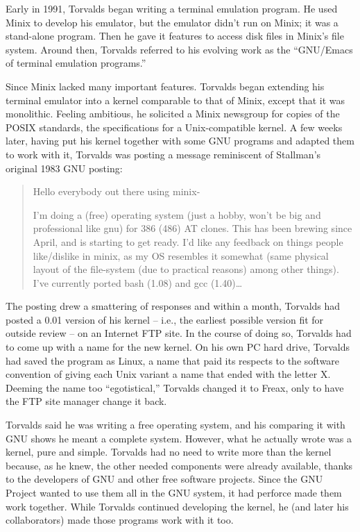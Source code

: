 Early in 1991, Torvalds began writing a terminal emulation program.  He used Minix to develop his emulator, but the emulator didn't run on Minix; it was a stand-alone program.  Then he gave it features to access disk files in Minix's file system.  Around then, Torvalds referred to his evolving work as the ``GNU/Emacs of terminal emulation programs.''

Since Minix lacked many important features. Torvalds began extending his terminal emulator into a kernel comparable to that of Minix, except that it was monolithic.  Feeling ambitious, he solicited a Minix newsgroup for copies of the POSIX standards, the specifications for a Unix-compatible kernel. A few weeks later, having put his kernel together with some GNU programs and adapted them to work with it, Torvalds was posting a message reminiscent of Stallman's original 1983 GNU posting:

\begin{quote}
Hello everybody out there using minix-

I'm doing a (free) operating system (just a hobby, won't be big and professional like gnu) for 386 (486) AT clones. This has been brewing since April, and is starting to get ready. I'd like any feedback on things people like/dislike in minix, as my OS resembles it somewhat (same physical layout of the file-system (due to practical reasons) among other things).  I've currently ported bash (1.08) and gcc (1.40)\ldots{}
\end{quote}

The posting drew a smattering of responses and within a month, Torvalds had posted a 0.01 version of his kernel -- i.e., the earliest possible version fit for outside review -- on an Internet FTP site. In the course of doing so, Torvalds had to come up with a name for the new kernel. On his own PC hard drive, Torvalds had saved the program as Linux, a name that paid its respects to the software convention of giving each Unix variant a name that ended with the letter X. Deeming the name too ``egotistical,'' Torvalds changed it to Freax, only to have the FTP site manager change it back.

Torvalds said he was writing a free operating system, and his comparing it with GNU shows he meant a complete system.  However, what he actually wrote was a kernel, pure and simple. Torvalds had no need to write more than the kernel because, as he knew, the other needed components were already available, thanks to the developers of GNU and other free software projects.  Since the GNU Project wanted to use them all in the GNU system, it had perforce made them work together.  While Torvalds continued developing the kernel, he (and later his collaborators) made those programs work with it too.

